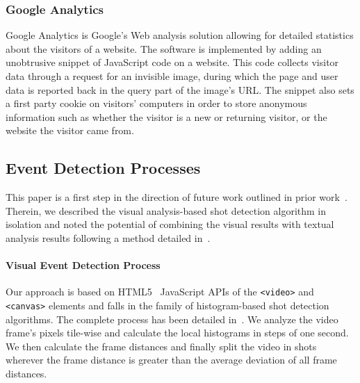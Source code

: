 \documentclass[runningheads,a4paper]{llncs}
\begin{document}
\subsubsection{Google Analytics}
Google Analytics is Google's Web analysis solution allowing for detailed statistics about the visitors of a website. The software is implemented by adding an unobtrusive snippet of JavaScript code on a website. This code collects visitor data through a request for an invisible image, during which the page and user data is reported back in the query part of the image's URL. The snippet also sets a first party cookie on visitors' computers in order to store anonymous information such as whether the visitor is a new or returning visitor, or the website the visitor came from.

\subsection{Event Detection Processes}
This paper is a first step in the direction of future work outlined in prior work~\cite{artemis}. Therein, we described the visual analysis-based shot detection algorithm in isolation and noted the potential of combining the visual results with textual analysis results following a method detailed in~\cite{semwebvid}.

\paragraph{Visual Event Detection Process}
Our approach is based on HTML5~\cite{w3c_html5} JavaScript APIs of the \texttt{<video>} and \texttt{<canvas>} elements and falls in the family of histogram-based shot detection algorithms. The complete process has been detailed in~\cite{artemis}. We analyze the video frame's pixels tile-wise and calculate the local histograms in steps of one second. We then calculate the frame distances and finally split the video in shots wherever the frame distance is greater than the average deviation of all frame distances.
\end{document}
